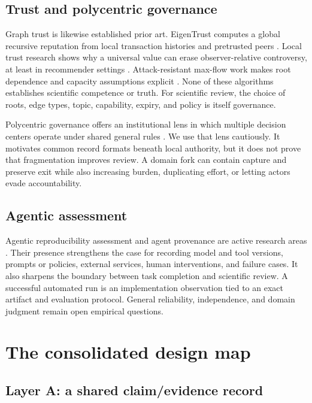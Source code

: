 \documentclass[11pt]{article}
\begin{document}
\subsection{Trust and polycentric governance}

Graph trust is likewise established prior art. EigenTrust computes a global recursive reputation from local transaction histories and pretrusted peers \citep{kamvar-eigentrust-2003}. Local trust research shows why a universal value can erase observer-relative controversy, at least in recommender settings \citep{massa-localtrust-2005}. Attack-resistant max-flow work makes root dependence and capacity assumptions explicit \citep{levien-aiken-1998}. None of these algorithms establishes scientific competence or truth. For scientific review, the choice of roots, edge types, topic, capability, expiry, and policy is itself governance.

Polycentric governance offers an institutional lens in which multiple decision centers operate under shared general rules \citep{ostrom-polycentric-2010}. We use that lens cautiously. It motivates common record formats beneath local authority, but it does not prove that fragmentation improves review. A domain fork can contain capture and preserve exit while also increasing burden, duplicating effort, or letting actors evade accountability.

\subsection{Agentic assessment}

Agentic reproducibility assessment and agent provenance are active research areas \citep{ara-2026,prov-agent-2025,traxia-2026}. Their presence strengthens the case for recording model and tool versions, prompts or policies, external services, human interventions, and failure cases. It also sharpens the boundary between task completion and scientific review. A successful automated run is an implementation observation tied to an exact artifact and evaluation protocol. General reliability, independence, and domain judgment remain open empirical questions.

\section{The consolidated design map}
\label{sec:architecture}

\subsection{Layer A: a shared claim/evidence record}
\end{document}
